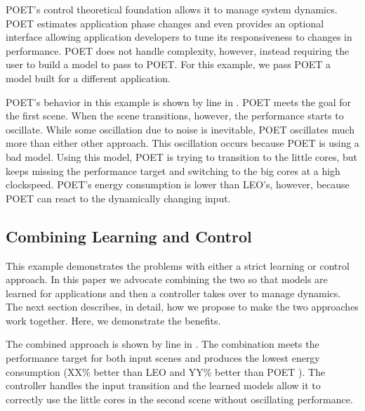 POET's control theoretical foundation allows it to manage system
dynamics.  POET estimates application phase changes and even provides
an optional interface allowing application developers to tune its
responsiveness to changes in performance.  POET does not handle
complexity, however, instead requiring the user to build a model to
pass to POET.  For this example, we pass POET a model built for a
different application.

POET's behavior in this example is shown by  line in
.  POET meets the goal for the first scene.  When the
scene transitions, however, the performance starts to oscillate.
While some oscillation due to noise is inevitable, POET oscillates
much more than either other approach.  This oscillation occurs because
POET is using a bad model.  Using this model, POET is trying to
transition to the little cores, but keeps missing the performance
target and switching to the big cores at a high clockspeed.  POET's
energy consumption is lower than LEO's, however, because POET can
react to the dynamically changing input.

\subsection{Combining Learning and Control}
This example demonstrates the problems with either a strict learning
or control approach.  In this paper we advocate combining the two so
that models are learned for applications and then a controller takes
over to manage dynamics.  The next section describes, in detail, how
we propose to make the two approaches work together.  Here, we
demonstrate the benefits.

The combined approach is shown by  line in
.  The combination meets the performance target for
both input scenes and produces the lowest energy consumption (XX\%
better than LEO and YY\% better than POET ).  The
controller handles the input transition and the learned models allow
it to correctly use the little cores in the second scene without
oscillating performance.
